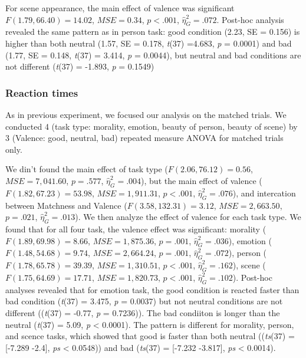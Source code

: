 \documentclass[
  english,
  man]{apa6}
\begin{document}
For scene appearance, the main effect of valence was significant \(F(1.79, 66.40) = 14.02\), \(\mathit{MSE} = 0.34\), \(p < .001\), \(\hat{\eta}^2_G = .072\). Post-hoc analysis revealed the same pattern as in person task: good condition (2.23, SE = 0.156) is higher than both neutral (1.57, SE = 0.178, \emph{t}(37) =4.683, \emph{p} = 0.0001) and bad (1.77, SE = 0.148, \emph{t}(37) = 3.414, \emph{p} = 0.0044), but neutral and bad conditions are not different (\emph{t}(37) = -1.893, \emph{p} = 0.1549)

\hypertarget{reaction-times-4}{%
\subsubsection{Reaction times}\label{reaction-times-4}}

As in previous experiment, we focused our analysis on the matched trials. We conducted 4 (task type: morality, emotion, beauty of person, beauty of scene) by 3 (Valence: good, neutral, bad) repeated measure ANOVA for matched trials only.

We din't found the main effect of task type (\(F(2.06, 76.12) = 0.56\), \(\mathit{MSE} = 7,041.60\), \(p = .577\), \(\hat{\eta}^2_G = .004\)), but the main effect of valence (\(F(1.82, 67.23) = 53.98\), \(\mathit{MSE} = 1,911.31\), \(p < .001\), \(\hat{\eta}^2_G = .076\)), and intercation between Matchness and Valence (\(F(3.58, 132.31) = 3.12\), \(\mathit{MSE} = 2,663.50\), \(p = .021\), \(\hat{\eta}^2_G = .013\)). We then analyze the effect of valence for each task type. We found that for all four task, the valence effect was significant: morality (\(F(1.89, 69.98) = 8.66\), \(\mathit{MSE} = 1,875.36\), \(p = .001\), \(\hat{\eta}^2_G = .036\)), emotion (\(F(1.48, 54.68) = 9.74\), \(\mathit{MSE} = 2,664.24\), \(p = .001\), \(\hat{\eta}^2_G = .072\)), person (\(F(1.78, 65.78) = 39.39\), \(\mathit{MSE} = 1,310.51\), \(p < .001\), \(\hat{\eta}^2_G = .162\)), scene (\(F(1.75, 64.69) = 17.71\), \(\mathit{MSE} = 1,820.73\), \(p < .001\), \(\hat{\eta}^2_G = .102\)). Post-hoc analyses revealed that for emotion task, the good condition is reacted faster than bad condition (\emph{t}(37) = 3.475, \emph{p} = 0.0037) but not neutral conditions are not different ((\emph{t}(37) = -0.77, \emph{p} = 0.7236)). The bad condiiton is longer than the neutral (\emph{t}(37) = 5.09, \emph{p} \textless{} 0.0001). The pattern is different for morality, person, and scence tasks, which showed that good is faster than both neutral ((\emph{ts}(37) = {[}-7.289 -2.4{]}, \emph{ps} \textless{} 0.0548)) and bad (\emph{ts}(37) = {[}-7.232 -3.817{]}, \emph{ps} \textless{} 0.0014).
\end{document}
